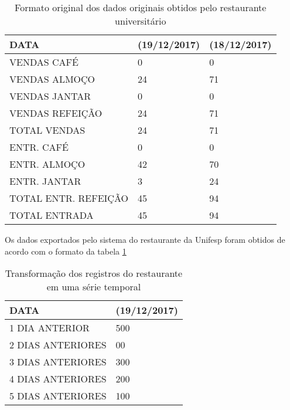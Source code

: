         	\begin{table}[!ht]
        	    \centering
        	    \caption{Formato original dos dados originais obtidos pelo restaurante universitário}
                \begin{tabular}{|l|l|l|}
                    \hline
                    DATA                  & (19/12/2017) & (18/12/2017) \\ \hline
                    VENDAS CAFÉ           & 0            & 0            \\
                    VENDAS ALMOÇO         & 24           & 71           \\
                    VENDAS JANTAR         & 0            & 0            \\
                    VENDAS REFEIÇÃO      & 24           & 71           \\
                    TOTAL VENDAS          & 24           & 71           \\
                    ENTR. CAFÉ            & 0            & 0            \\
                    ENTR. ALMOÇO          & 42           & 70           \\
                    ENTR. JANTAR          & 3            & 24           \\
                    TOTAL ENTR. REFEIÇÃO & 45           & 94           \\
                    TOTAL ENTRADA         & 45           & 94           \\ \hline
                \end{tabular}
               
                \label{table:dadosrestaurante}
            \end{table}
            Os dados exportados pelo sistema do restaurante da Unifesp foram obtidos de acordo com o formato da tabela \ref{table:dadosrestaurante}\\
            
            \begin{table}[!ht]
                \centering
                \begin{tabular}{|l|l|}
                \hline
                    DATA                  & (19/12/2017) \\ \hline
                1 DIA ANTERIOR    & 500        \\
                2 DIAS ANTERIORES & 00                            \\
                3 DIAS ANTERIORES & 300                            \\
                4 DIAS ANTERIORES & 200                            \\
                5 DIAS ANTERIORES & 100                          \\ \hline 
                \end{tabular}
                \caption{Transformação dos registros do restaurante em uma série temporal}
                \label{table:transformacaodadosrestaurante}
            \end{table}
            
